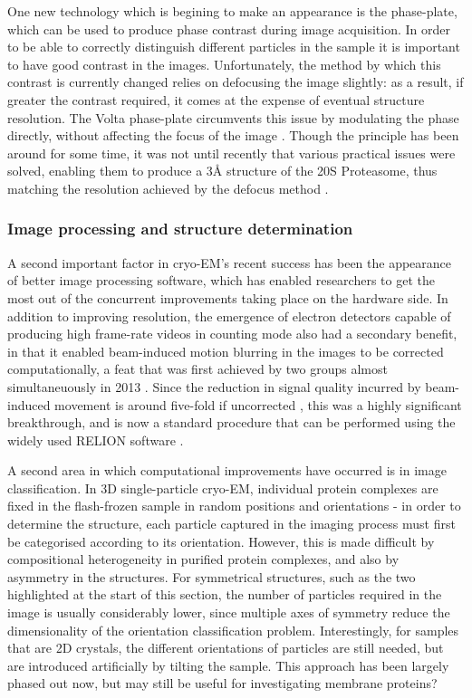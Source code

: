 \documentclass[a4paper,11pt,twoside,openright]{scrbook}
\let\cite\supercite
\begin{document}
One new technology which is begining to make an appearance is the phase-plate, which can be used to produce phase contrast during image acquisition. In order to be able to correctly distinguish different particles in the sample it is important to have good contrast in the images. Unfortunately, the method by which this contrast is currently changed relies on defocusing the image slightly: as a result, if greater the contrast required, it comes at the expense of eventual structure resolution. The Volta phase-plate circumvents this issue by modulating the phase directly, without affecting the focus of the image \cite{Danev2014}. Though the principle has been around for some time, it was not until recently that various practical issues were solved, enabling them to produce a 3Å structure of the 20S Proteasome, thus matching the resolution achieved by the defocus method \cite{Danev2016}.

\subsubsection{Image processing and structure determination}
A second important factor in cryo-EM's recent success has been the appearance of better image processing software, which has enabled researchers to get the most out of the concurrent improvements taking place on the hardware side. In addition to improving resolution, the emergence of electron detectors capable of producing high frame-rate videos in counting mode also had a secondary benefit, in that it enabled beam-induced motion blurring in the images to be corrected computationally, a feat that was first achieved by two groups almost simultaneuously in 2013 \cite{Bai2013, Li2013}. Since the reduction in signal quality incurred by beam-induced movement is around five-fold if uncorrected \cite{Henderson1985}, this was a highly significant breakthrough, and is now a standard procedure that can be performed using the widely used RELION software \cite{Scheres2012,Scheres2014}.

A second area in which computational improvements have occurred is in image classification. In 3D single-particle cryo-EM, individual protein complexes are fixed in the flash-frozen sample in random positions and orientations - in order to determine the structure, each particle captured in the imaging process must first be categorised according to its orientation. However, this is made difficult by compositional heterogeneity in purified protein complexes, and also by asymmetry in the structures. For symmetrical structures, such as the two highlighted at the start of this section, the number of particles required in the image is usually considerably lower, since multiple axes of symmetry reduce the dimensionality of the orientation classification problem. Interestingly, for samples that are 2D crystals, the different orientations of particles are still needed, but are introduced artificially by tilting the sample. This approach has been largely phased out now, but may still be useful for investigating membrane proteins?
\end{document}
